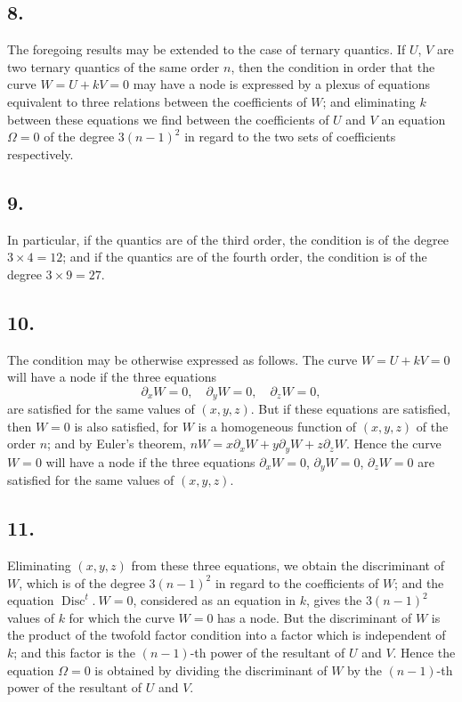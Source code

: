 \documentclass[11pt,a4paper]{article}
\theoremstyle{definition}
\DeclareMathOperator{\Disc}{Disc}
\begin{document}
\subsection*{8.}

The foregoing results may be extended to the case of ternary quantics. If $U$, $V$ are
two ternary quantics of the same order $n$, then the condition in order that the curve
$W = U + kV = 0$ may have a node is expressed by a plexus of equations equivalent to three
relations between the coefficients of $W$; and eliminating $k$ between these equations we find
between the coefficients of $U$ and $V$ an equation $\Omega = 0$ of the degree $3(n - 1)^{2}$ in regard to
the two sets of coefficients respectively.

\subsection*{9.}

In particular, if the quantics are of the third order, the condition is of the degree $3 \times 4 = 12$;
and if the quantics are of the fourth order, the condition is of the degree $3 \times 9 = 27$.

\subsection*{10.}

The condition may be otherwise expressed as follows. The curve $W = U + kV = 0$
will have a node if the three equations
\[
\partial_{x}W = 0,\quad \partial_{y}W = 0,\quad \partial_{z}W = 0,
\]
are satisfied for the same values of $(x, y, z)$. But if these equations are satisfied, then
$W = 0$ is also satisfied, for $W$ is a homogeneous function of $(x, y, z)$ of the order $n$; and
by Euler's theorem, $nW = x\partial_{x}W + y\partial_{y}W + z\partial_{z}W$. Hence the curve $W = 0$ will have a
node if the three equations $\partial_{x}W = 0$, $\partial_{y}W = 0$, $\partial_{z}W = 0$ are satisfied for the same values
of $(x, y, z)$.

\newpage
\subsection*{11.}

Eliminating $(x, y, z)$ from these three equations, we obtain the discriminant of $W$,
which is of the degree $3(n - 1)^{2}$ in regard to the coefficients of $W$; and the equation
$\Disc^{t}.\ W = 0$, considered as an equation in $k$, gives the $3(n - 1)^{2}$ values of $k$ for which
the curve $W = 0$ has a node. But the discriminant of $W$ is the product of the twofold
factor condition into a factor which is independent of $k$; and this factor is the $(n - 1)$-th
power of the resultant of $U$ and $V$. Hence the equation $\Omega = 0$ is obtained by dividing
the discriminant of $W$ by the $(n - 1)$-th power of the resultant of $U$ and $V$.
\end{document}
